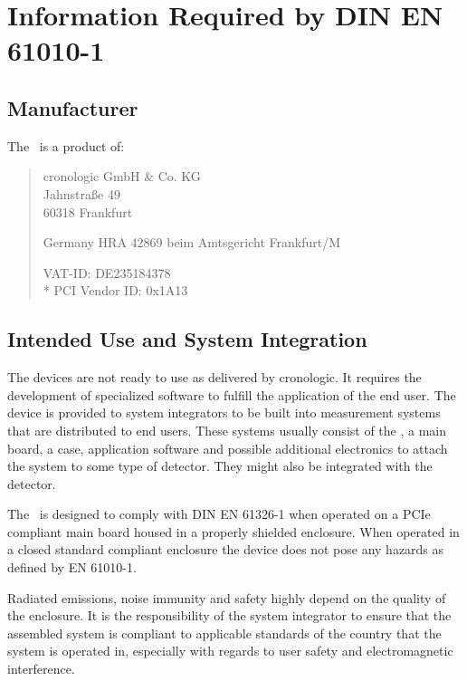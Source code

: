 \newpage
\section{Information Required by DIN EN 61010-1}
\subsection{Manufacturer\label{cp:manu}}

The \deviceName\ is a product of:\

\begin{quote}
	cronologic GmbH \& Co. KG\\
	Jahnstra\ss{}e 49\\
	60318 Frankfurt\par
	Germany
	\noindent HRA 42869 beim Amtsgericht Frankfurt/M\par
	\noindent VAT-ID: DE235184378 \\*
	\noindent PCI Vendor ID: 0x1A13
\end{quote}

\subsection{Intended Use and System Integration}

	The devices are not ready to use as delivered by cronologic. It requires the development of specialized software to fulfill the application of the end user. The device is provided to system integrators to be built into measurement systems that are distributed to end users. These systems usually consist of the \deviceName, a main board, a case, application software and possible additional electronics to attach the system to some type of detector. They might also be integrated with the detector.\par

	The \deviceName\ is designed to comply with DIN EN 61326-1 when operated on a PCIe compliant main board housed in a properly shielded enclosure. 
	When operated in a closed standard compliant enclosure the device does not pose any hazards as defined by EN 61010-1.\par

	Radiated emissions, noise immunity and safety highly depend on the quality of the enclosure. 
	It is the responsibility of the system integrator to ensure that the assembled system is compliant to applicable standards of the country that the system is operated in, especially with regards to user safety and electromagnetic interference. \par
	 

